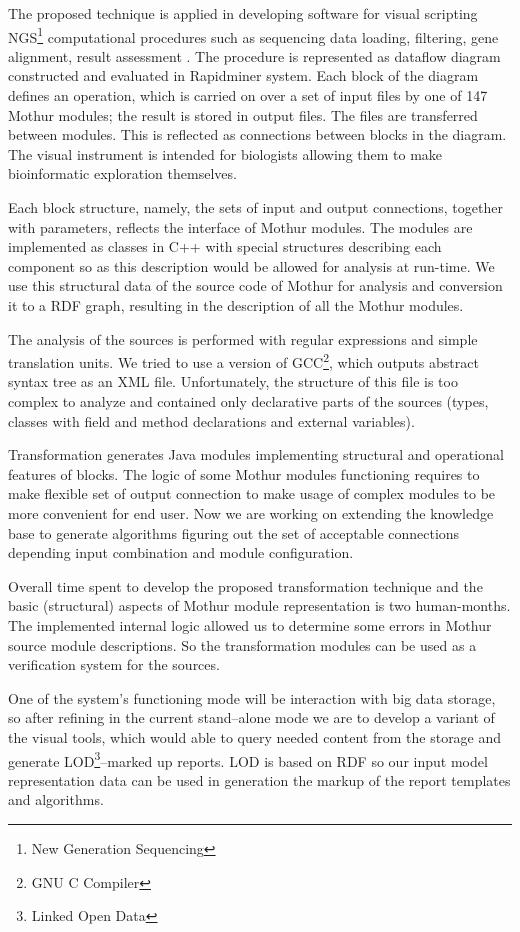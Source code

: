\documentclass[conference]{IEEEtran} \IEEEoverridecommandlockouts
\begin{document}
The proposed technique is applied in developing software for visual scripting NGS\footnote{New Generation Sequencing} computational procedures such as sequencing data loading, filtering, gene alignment, result assessment \cite{bit2019}. The procedure is represented as dataflow diagram constructed and evaluated in Rapidminer system. Each block of the diagram defines an operation, which is carried on over a set of input files by one of 147 Mothur modules; the result is stored in output files. The files are transferred between modules. This is reflected as connections between blocks in the diagram. The visual instrument is intended for biologists allowing them to make bioinformatic exploration themselves. 

Each block structure, namely, the sets of input and output connections, together with parameters, reflects the interface of Mothur modules. The modules are implemented as classes in C++ with special structures describing each component so as this description would be allowed for analysis at run-time. We use this structural data of the source code of Mothur for analysis and conversion it to a RDF graph, resulting in the description of all the Mothur modules. 

The analysis of the sources is performed with regular expressions and simple translation units. We tried to use a version of GCC\footnote{GNU C Compiler}, which outputs abstract syntax tree as an XML file. Unfortunately, the structure of this file is too complex to analyze and contained only declarative parts of the sources (types, classes with field and method declarations and external variables). 

Transformation generates Java modules implementing structural and operational features of blocks. The logic of some Mothur modules functioning requires to make flexible set of output connection to make usage of complex modules to be more convenient for end user. Now we are working on extending the knowledge base to generate algorithms figuring out the set of acceptable connections depending input combination and module configuration. 

Overall time spent to develop the proposed transformation technique and the basic (structural) aspects of Mothur module representation is two human-months. The implemented internal logic allowed us to determine some errors in Mothur source module descriptions. So the transformation modules can be used as a verification system for the sources. 

One of the system's functioning mode will be interaction with big data storage, so after refining in the current stand--alone mode we are to develop a variant of the visual tools, which would able to query needed content from the storage and generate LOD\footnote{Linked Open Data}--marked up reports. LOD is based on RDF so our input model representation data can be used in generation the markup of the report templates and algorithms. 
\end{document}
